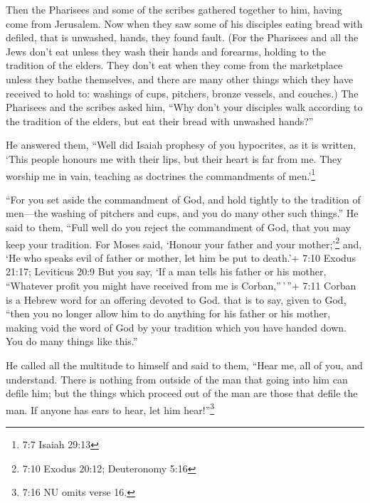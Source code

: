  Then the Pharisees and some of the scribes gathered
together to him, having come from Jerusalem.  Now when they
saw some of his disciples eating bread with defiled, that is unwashed,
hands, they found fault.  (For the Pharisees and all the
Jews don't eat unless they wash their hands and forearms, holding to the
tradition of the elders.  They don't eat when they come from
the marketplace unless they bathe themselves, and there are many other
things which they have received to hold to: washings of cups, pitchers,
bronze vessels, and couches.)  The Pharisees and the scribes
asked him, ``Why don't your disciples walk according to the tradition of
the elders, but eat their bread with unwashed hands?''

 He answered them, ``Well did Isaiah prophesy of you
hypocrites, as it is written, `This people honours me with their lips,
but their heart is far from me.  They worship me in vain,
teaching as doctrines the commandments of men.'\footnote{7:7 Isaiah
  29:13}

 ``For you set aside the commandment of God, and hold
tightly to the tradition of men---the washing of pitchers and cups, and
you do many other such things.''  He said to them, ``Full
well do you reject the commandment of God, that you may keep your
tradition.  For Moses said, `Honour your father and your
mother;'\footnote{7:10 Exodus 20:12; Deuteronomy 5:16} and, `He who
speaks evil of father or mother, let him be put to death.'+ 7:10 Exodus
21:17; Leviticus 20:9  But you say, `If a man tells his
father or his mother, ``Whatever profit you might have received from me
is Corban,''\,'\,''+ 7:11 Corban is a Hebrew word for an offering
devoted to God. that is to say, given to God,  ``then you
no longer allow him to do anything for his father or his mother,
 making void the word of God by your tradition which you
have handed down. You do many things like this.''

 He called all the multitude to himself and said to them,
``Hear me, all of you, and understand.  There is nothing
from outside of the man that going into him can defile him; but the
things which proceed out of the man are those that defile the man.
 If anyone has ears to hear, let him hear!''\footnote{7:16
  NU omits verse 16.}

